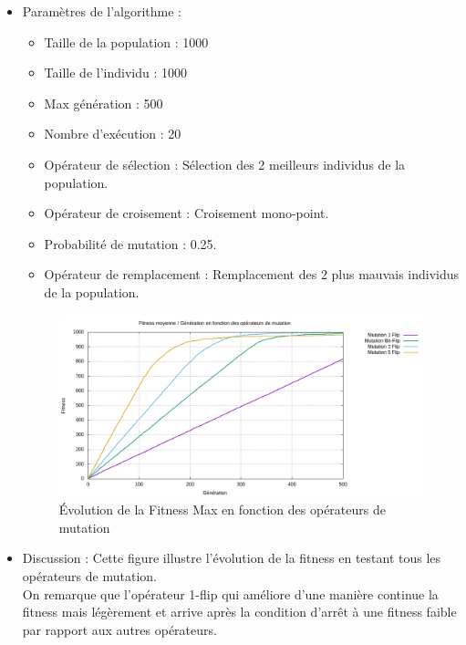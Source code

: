 \documentclass[12pt]{article}
\begin{document}
\begin{itemize}
\item{Paramètres de l'algorithme :}
	\begin{itemize}[label=-]
		\item{Taille de la population : } 1000
		\item{Taille de l'individu :} 1000
		\item{Max génération :} 500
		\item{Nombre d'exécution :} 20
		\item{Opérateur de sélection :} Sélection des 2 meilleurs individus de la population.
		\item{Opérateur de croisement :} Croisement mono-point.
		\item{Probabilité de mutation :} 0.25.
		\item{Opérateur de remplacement :} Remplacement des 2 plus mauvais individus de la population.
		\label{param_algo_1}
	\end{itemize} 

\begin{figure}[H]
		\begin{center}
			\includegraphics[scale=0.5]{img/fitness_op_mut.png}
			\caption{Évolution de la Fitness Max en fonction des opérateurs de mutation}
			\label{fitness_op_mut}
		\end{center}
\end{figure}

\item{Discussion :} Cette figure illustre l'évolution de la fitness en testant tous les opérateurs de mutation.\\

On remarque que l'opérateur 1-flip qui améliore d'une manière continue la fitness mais légèrement et arrive après la condition d'arrêt à une fitness faible par rapport aux autres opérateurs.\\


\end{itemize}
\end{document}

